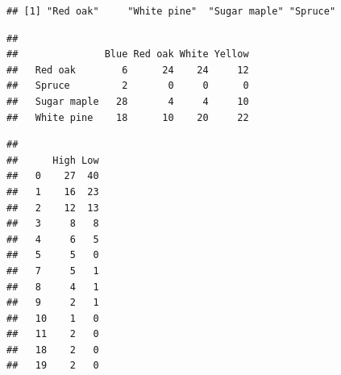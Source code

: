 \documentclass[
]{article}
\newenvironment{Shaded}{\begin{snugshade}}{\end{snugshade}}
\newcommand{\DocumentationTok}[1]{\textcolor[rgb]{0.56,0.35,0.01}{\textbf{\textit{#1}}}}
\newcommand{\FunctionTok}[1]{\textcolor[rgb]{0.13,0.29,0.53}{\textbf{#1}}}
\newcommand{\NormalTok}[1]{#1}
\newcommand{\SpecialCharTok}[1]{\textcolor[rgb]{0.81,0.36,0.00}{\textbf{#1}}}
\begin{document}
\begin{verbatim}
## [1] "Red oak"     "White pine"  "Sugar maple" "Spruce"
\end{verbatim}

\begin{Shaded}
\end{Shaded}

\begin{verbatim}
##              
##               Blue Red oak White Yellow
##   Red oak        6      24    24     12
##   Spruce         2       0     0      0
##   Sugar maple   28       4     4     10
##   White pine    18      10    20     22
\end{verbatim}

\begin{Shaded}
\end{Shaded}

\begin{verbatim}
##     
##      High Low
##   0    27  40
##   1    16  23
##   2    12  13
##   3     8   8
##   4     6   5
##   5     5   0
##   7     5   1
##   8     4   1
##   9     2   1
##   10    1   0
##   11    2   0
##   18    2   0
##   19    2   0
\end{verbatim}
\end{document}
